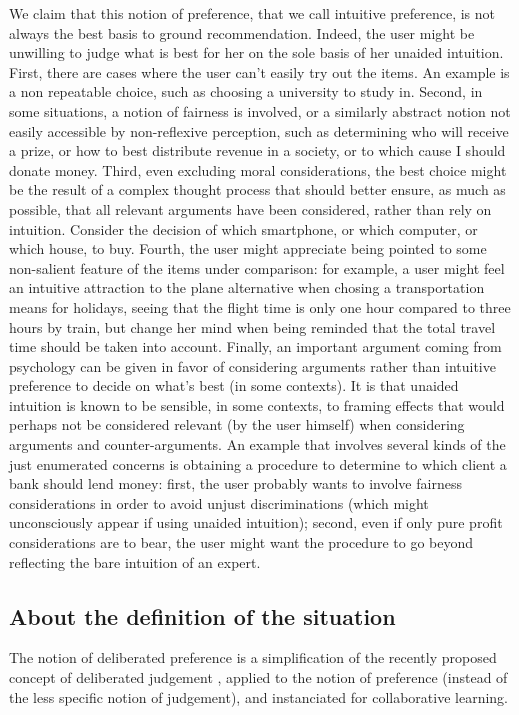 \documentclass[french, english]{da2pl2018}
\begin{document}
We claim that this notion of preference, that we call intuitive preference, is not always the best basis to ground recommendation. Indeed, the user might be unwilling to judge what is best for her on the sole basis of her unaided intuition. First, there are cases where the user can’t easily try out the items. An example is a non repeatable choice, such as choosing a university to study in. Second, in some situations, a notion of fairness is involved, or a similarly abstract notion not easily accessible by non-reflexive perception, such as determining who will receive a prize, or how to best distribute revenue in a society, or to which cause I should donate money. Third, even excluding moral considerations, the best choice might be the result of a complex thought process that should better ensure, as much as possible, that all relevant arguments have been considered, rather than rely on intuition. Consider the decision of which smartphone, or which computer, or which house, to buy. Fourth, the user might appreciate being pointed to some non-salient feature of the items under comparison: for example, a user might feel an intuitive attraction to the plane alternative when chosing a transportation means for holidays, seeing that the flight time is only one hour compared to three hours by train, but change her mind when being reminded that the total travel time should be taken into account. Finally, an important argument coming from psychology can be given in favor of considering arguments rather than intuitive preference to decide on what’s best (in some contexts). It is that unaided intuition is known to be sensible, in some contexts, to framing effects that would perhaps not be considered relevant (by the user himself) when considering arguments and counter-arguments. An example that involves several kinds of the just enumerated concerns is obtaining a procedure to determine to which client a bank should lend money: first, the user probably wants to involve fairness considerations in order to avoid unjust discriminations (which might unconsciously appear if using unaided intuition); second, even if only pure profit considerations are to bear, the user might want the procedure to go beyond reflecting the bare intuition of an expert.

\subsection{About the definition of the situation}
The notion of deliberated preference is a simplification of the recently proposed concept of deliberated judgement \citep{cailloux_formal_2017}, applied to the notion of preference (instead of the less specific notion of judgement), and instanciated for collaborative learning.
\end{document}
